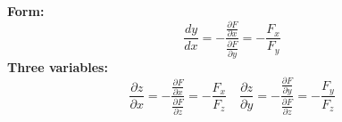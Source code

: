 \documentclass[2pt]{article}
\begin{document}
\begin{multicols}{2}
\begin{tcolorbox}[title=\textbf{Implicit Differentiation}, colframe=lightblue]
    \textbf{Form:} 	
    \[ \frac{dy}{dx} = -\frac{\frac{\partial F}{\partial x}}{\frac{\partial F}{\partial y}} = -\frac{F_x}{F_y} \]
    \textbf{Three variables:}
    \[ \frac{\partial z}{\partial x} = -\frac{\frac{\partial F}{\partial x}}{\frac{\partial F}{\partial z}} = -\frac{F_x}{F_z} \quad \frac{\partial z}{\partial y} = -\frac{\frac{\partial F}{\partial y}}{\frac{\partial F}{\partial z}} = -\frac{F_y}{F_z} \]
\end{tcolorbox}


\end{multicols}
\end{document}
